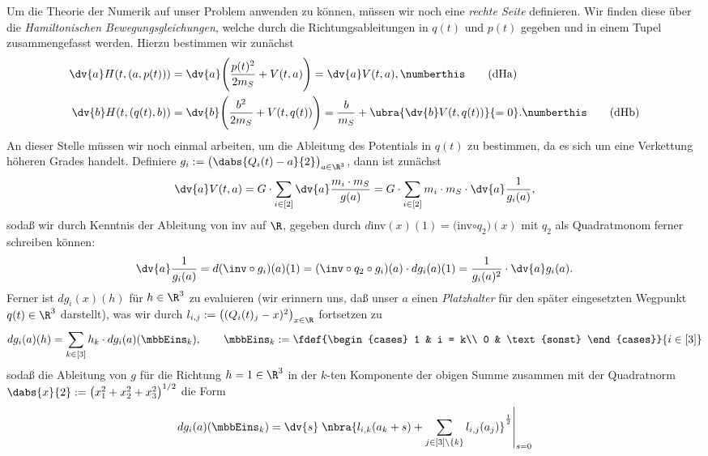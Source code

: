 \documentclass{subfiles}
\begin{document}
    Um die Theorie der Numerik auf unser Problem anwenden zu können, müssen wir noch eine \emph{rechte Seite} definieren. Wir finden diese über die \emph{Hamiltonischen Bewegungsgleichungen}, welche durch die Richtungsableitungen in $q(t)$ und $p(t)$ gegeben und in einem Tupel zusammengefasst werden. Hierzu bestimmen wir zunächst
    \begin{align*}
        \dv{a}H(t,(a,p(t))) &= \dv{a}\Biggl(
                \frac{p(t)^2}{2m_S} + V(t,a)
        \Biggr) = \dv{a}V(t,a),\numberthis\label{eq:dHa}\tag{dHa}\\
        \dv{b}H(t,(q(t),b)) &= \dv{b}\Biggl(
                \frac{b^2}{2m_S} + V(t,q(t))
        \Biggr) = \frac{b}{m_S} + \ubra{\dv{b}V(t,q(t))}{=0}.\numberthis\label{eq:dHb}\tag{dHb}
    \end{align*}    
    An dieser Stelle müssen wir noch einmal arbeiten, um die Ableitung des Potentials in $q(t)$ zu bestimmen, da es sich um eine Verkettung höheren Grades handelt. Definiere $g_i:=\bigl(\dabs{Q_i(t)-a}{2}\bigr)_{a\in\R^3}$, dann ist zunächst
    \[
        \dv{a}V(t,a) = G\cdot\sum_{i\in[2]}\dv{a}\frac{m_i\cdot m_S}{g(a)} = G\cdot\sum_{i\in[2]}m_i\cdot m_S\cdot\dv{a}\frac{1}{g_i(a)},
    \]
    sodaß wir durch Kenntnis der Ableitung von inv auf $\R$, gegeben durch $d$inv$(x)(1) = ($inv$\circ q_2)(x)$ mit $q_2$ als Quadratmonom ferner schreiben können:
    \[
        \dv{a}\frac{1}{g_i(a)} = d(\inv\circ g_i)(a)(1) = (\inv\circ q_2\circ g_i)(a)\cdot dg_i(a)(1) = \frac{1}{g_i(a)^2}\cdot \dv{a}g_i(a).  
    \]
    Ferner ist $dg_i(x)(h)$ für $h\in\R^3$ zu evaluieren (wir erinnern uns, daß unser $a$ einen \emph{Platzhalter} für den später eingesetzten Wegpunkt $q(t)\in\R^3$ darstellt), was wir durch $l_{i,j}:=\bigl((Q_i(t)_j - x)^2\bigr)_{x\in\R}$ fortsetzen zu
    \[
        dg_i(a)(h) = \sum_{k\in[3]}h_k\cdot dg_i(a)(\mbbEins_k), \qquad\mbbEins_{k}:=\fdef{\begin{cases}
            1 & i = k\\
            0 & \text{sonst}
        \end{cases}}{i\in[3]}
    \]
    sodaß die Ableitung von $g$ für die Richtung $h=1\in\R^3$ in der $k$-ten Komponente der obigen Summe zusammen mit der Quadratnorm $\dabs{x}{2} := \bigl(x_1^2 + x_2^2 + x_3^2\bigr)^{1/2}$ die Form 
    \[
        dg_i(a)(\mbbEins_k) = \dv{s}\left.\nbra{l_{i,k}(a_k + s) + \sum_{j\in[3]\setminus{\{k\}}}l_{i,j}(a_j)}^{\frac12}\right|_{s=0}
    \]
\end{document}
